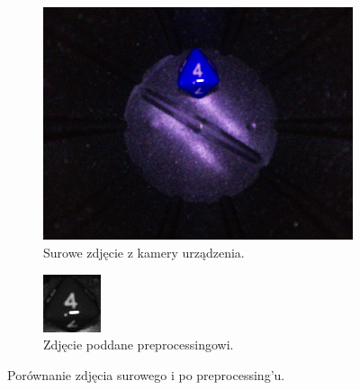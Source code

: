 \begin{figure}[H]
    \centering
    \begin{subfigure}[t]{0.45\linewidth}
        \centering
        \includegraphics[width=\linewidth]{chapters/04-czytanie/figures/4raw}
        \caption{Surowe zdjęcie z kamery urządzenia.}
        \label{fig:4raw}
    \end{subfigure}
    \hfill
    \begin{subfigure}[t]{0.45\linewidth}
        \centering
        \includegraphics[width=\linewidth]{chapters/04-czytanie/figures/4processed}
        \caption{Zdjęcie poddane preprocessingowi.}
        \label{fig:4proc}
    \end{subfigure}
    \caption{Porównanie zdjęcia surowego i po preprocessing’u.}
    \label{fig:4combined}
\end{figure}


